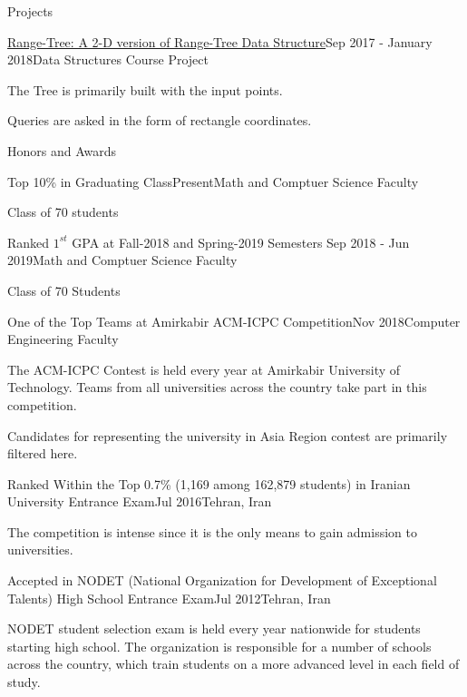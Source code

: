 \documentclass{resume} %
\begin{document}
\begin{rSection}{Projects}
		
		\begin{rSubsection}{\href{https://github.com/pouyaaghahoseini/DS-Course}{Range-Tree: A 2-D version of Range-Tree Data Structure}}{Sep 2017 - January 2018}{Data Structures Course Project}{ }
			\item The Tree is primarily built with the input points.
			\item Queries are asked in the form of rectangle coordinates. 
			\\
		\end{rSubsection}
	\end{rSection}
	\begin{rSection}{Honors and Awards}
		\begin{rSubsection}{Top 10\% in Graduating Class}{Present}{Math and Comptuer Science Faculty}{ }
			\item Class of 70 students
		\end{rSubsection}
		
		\begin{rSubsection}{Ranked $1^{st}$ GPA at Fall-2018 and Spring-2019 Semesters }{Sep 2018 - Jun 2019}{Math and Comptuer Science Faculty}{ }
			\item Class of 70 Students
		\end{rSubsection}	
		
		\begin{rSubsection}{One of the Top Teams at Amirkabir ACM-ICPC Competition}{Nov 2018}{Computer Engineering Faculty}{ }
			\item The ACM-ICPC Contest is held every year at Amirkabir University of Technology. Teams from all universities across the country take part in this competition.
			\item Candidates for representing the university in Asia Region contest are primarily filtered here.
		\end{rSubsection}
		
		\begin{rSubsection}{Ranked Within the Top 0.7\% (1,169 among 162,879 students) in Iranian University Entrance Exam}{Jul 2016}{Tehran, Iran }{ }
			\item The competition is intense since it is the only means to gain admission to universities.
		\end{rSubsection} 
		
		\begin{rSubsection}{Accepted in NODET (National Organization for Development of Exceptional Talents) High School Entrance Exam}{Jul 2012}{Tehran, Iran }{ }
			\item NODET student selection exam is held every year nationwide for students starting high school. The organization is responsible for a number of schools across the country, which train students on a more advanced level in each field of study.
		\end{rSubsection}
		
	\end{rSection}
\end{document}
